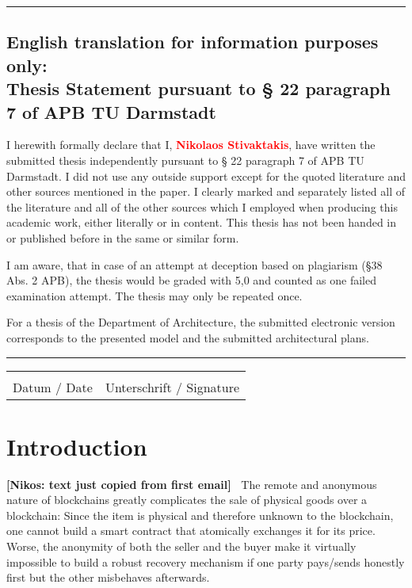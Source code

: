 \documentclass{cacthesis}
\newcommand{\authnote}[3]{{ \footnotesize \textbf{#1[#2: #3]~}}}
\newcommand{\niknote}[1]{\authnote{\color{red}}{Nikos}{#1}}
\begin{document}
	\vspace{10pt}
	\hrule
	
	\section*{English translation for information purposes only:\\Thesis Statement pursuant to § 22 paragraph 7 of APB TU Darmstadt}
	
	I herewith formally declare that I, \textcolor{red}{\textbf{Nikolaos Stivaktakis}}, have written the submitted thesis independently pursuant to § 22 paragraph 7 of APB TU Darmstadt. I did not use any outside support except for the quoted literature and other sources mentioned in the paper. I clearly marked and separately listed all of the literature and all of the other sources which I employed when producing this academic work, either literally or in content. This thesis has not been handed in or published before in the same or similar form.
	
	I am aware, that in case of an attempt at deception based on plagiarism (§38 Abs. 2 APB), the thesis would be graded with 5,0 and counted as one failed examination attempt. The thesis may only be repeated once.
	
	For a thesis of the Department of Architecture, the submitted electronic version corresponds to the presented model and the submitted architectural plans.
	
	\vspace{10pt}
	\hrule
	\vspace{70pt}
	
	\noindent\begin{tabular}{l@{\hskip 1in}l}
		\makebox[1.8in]{\hrulefill} & \makebox[3.5in]{\hrulefill}\\
		Datum / Date & Unterschrift / Signature
	\end{tabular}
	
	\listoffigures
	\listoftables
	\tableofcontents
	
	\mainmatter
	
	\chapter{Introduction}
	\niknote{text just copied from first email}
The remote and anonymous nature of blockchains greatly complicates the sale of physical goods over a blockchain: Since the item is physical and therefore unknown to the blockchain, one cannot build a smart contract that atomically exchanges it for its price. Worse, the anonymity of both the seller and the buyer make it virtually impossible to build a robust recovery mechanism if one party pays/sends honestly first but the other misbehaves afterwards.
\end{document}
